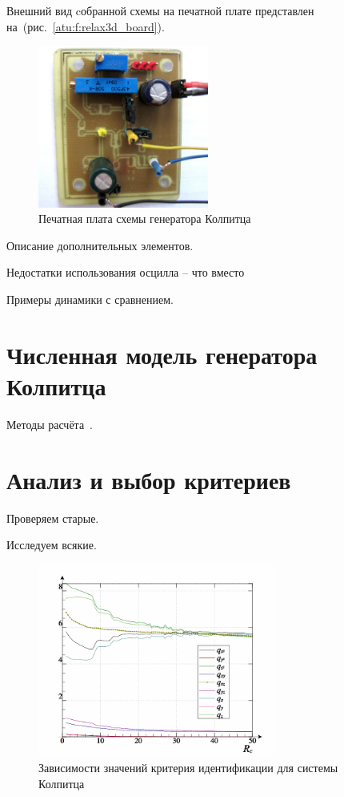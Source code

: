 Внешний вид cобранной схемы на печатной плате представлен на~(рис.~\ref{atu:f:relax3d_board}).

\begin{figure}[htb!]
\centerline{\includegraphics[width=0.5\textwidth]{p/colp_board.jpg} }
\caption{Печатная плата схемы генератора Колпитца}
\label{atu:f:colp_board}
\end{figure}


Описание дополнительных элементов.

Недостатки использования осцилла -- что вместо

Примеры динамики с сравнением.

\section{Численная модель генератора Колпитца}

Методы расчёта~\cite{zaeplnii_radio_calc}.

\section{Анализ и выбор критериев}

Проверяем старые.

Исследуем всякие.

\begin{figure}[htb!]
\centerline{\includegraphics[width=0.7\textwidth]{p/colp_bjt_q-p_Rc_q.png} }
\caption{Зависимости значений критерия идентификации для системы Колпитца}
\label{atu:colp_bjt_q-p_Rc_q}
\end{figure}

